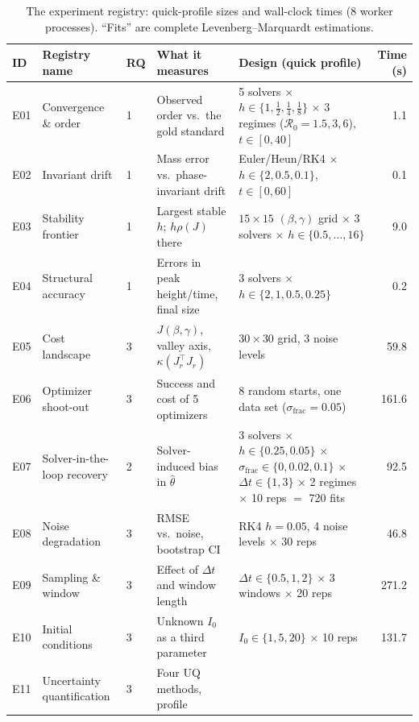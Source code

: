 \documentclass[sigconf]{acmart}
\begin{document}
\begin{table}[t]
  \centering
  \footnotesize
  \caption{The experiment registry: quick-profile sizes and wall-clock
    times (8 worker processes). ``Fits'' are complete
    Levenberg--Marquardt estimations.}
  \label{tab:exp}
  \begin{tabularx}{\textwidth}{@{}l l l X X r@{}}
    \toprule
    ID & Registry name & RQ & What it measures & Design (quick profile) & Time (s)\\
    \midrule
    E01 & Convergence \& order & 1 & Observed order vs.\ the gold standard &
      5 solvers $\times$ $h\in\{1,\tfrac12,\tfrac14,\tfrac18\}$ $\times$ 3
      regimes ($\mathcal R_0=1.5,3,6$), $t\in[0,40]$ & 1.1\\
    E02 & Invariant drift & 1 & Mass error vs.\ phase-invariant drift &
      Euler/Heun/RK4 $\times$ $h\in\{2,0.5,0.1\}$, $t\in[0,60]$ & 0.1\\
    E03 & Stability frontier & 1 & Largest stable $h$; $h\rho(J)$ there &
      $15\times15$ $(\beta,\gamma)$ grid $\times$ 3 solvers $\times$
      $h\in\{0.5,\dots,16\}$ & 9.0\\
    E04 & Structural accuracy & 1 & Errors in peak height/time, final size &
      3 solvers $\times$ $h\in\{2,1,0.5,0.25\}$ & 0.2\\
    E05 & Cost landscape & 3 & $J(\beta,\gamma)$, valley axis,
      $\kappa(J_r^\top J_r)$ & $30\times30$ grid, 3 noise levels & 59.8\\
    E06 & Optimizer shoot-out & 3 & Success and cost of 5 optimizers &
      8 random starts, one data set ($\sigma_{\mathrm{frac}}=0.05$) & 161.6\\
    E07 & Solver-in-the-loop recovery & 2 & Solver-induced bias in
      $\hat\theta$ & 3 solvers $\times$ $h\in\{0.25,0.05\}$ $\times$
      $\sigma_{\mathrm{frac}}\in\{0,0.02,0.1\}$ $\times$
      $\Delta t\in\{1,3\}$ $\times$ 2 regimes $\times$ 10 reps $=$ 720 fits
      & 92.5\\
    E08 & Noise degradation & 3 & RMSE vs.\ noise, bootstrap CI &
      RK4 $h=0.05$, 4 noise levels $\times$ 30 reps & 46.8\\
    E09 & Sampling \& window & 3 & Effect of $\Delta t$ and window length &
      $\Delta t\in\{0.5,1,2\}$ $\times$ 3 windows $\times$ 20 reps & 271.2\\
    E10 & Initial conditions & 3 & Unknown $I_0$ as a third parameter &
      $I_0\in\{1,5,20\}$ $\times$ 10 reps & 131.7\\
    E11 & Uncertainty quantification & 3 & Four UQ methods, profile

\end{tabularx}
\end{table}
\end{document}
